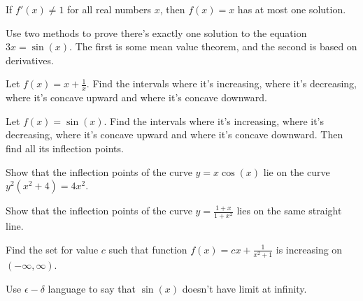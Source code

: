 \documentclass[Calculus 1 Recitation.tex]{subfiles}
\begin{document}
\begin{myleftlinebox}
	If $f'(x)\neq 1$ for all real numbers $x$, then $f(x)=x$ has at most one solution.
	\tcblower
	\vspace{2em}
\end{myleftlinebox}

\begin{myleftlinebox}
	Use two methods to prove there's exactly one solution to the equation $3x=\sin(x)$. The first is some mean value theorem, and the second is based on derivatives.
	\tcblower
	\vspace{2em}	
\end{myleftlinebox}

\begin{myleftlinebox}
	Let $f(x)=x+\frac{1}{x}$. Find the intervals where it's increasing, where it's decreasing, where it's concave upward and where it's concave downward.
	\tcblower
	\vspace{2em}
\end{myleftlinebox}

\begin{myleftlinebox}
	Let $f(x)=\sin(x)$. Find the intervals where it's increasing, where it's decreasing, where it's concave upward and where it's concave downward. Then find all its inflection points.
	\tcblower
	\vspace{2em}
\end{myleftlinebox}

\begin{myleftlinebox}
	Show that the inflection points of the curve $y=x\cos (x)$ lie on the curve $y^2(x^2+4)=4x^2$.
	\tcblower
	\vspace{2em}	
\end{myleftlinebox}

\begin{myleftlinebox}
	Show that the inflection points of the curve $y=\frac{1+x}{1+x^2}$ lies on the same straight line.
	\tcblower
	\vspace{2em}	
\end{myleftlinebox}

\begin{myleftlinebox}
	Find the set for value $c$ such that function $f(x)=cx+\frac{1}{x^2+1}$ is increasing on $(-\infty,\infty)$.
	\tcblower
	\vspace{2em}	
\end{myleftlinebox}

\begin{myleftlinebox}
	Use $\epsilon-\delta$ language to say that $\sin(x)$ doesn't have limit at infinity.
	\tcblower
	\vspace{2em}
\end{myleftlinebox}
\end{document}
